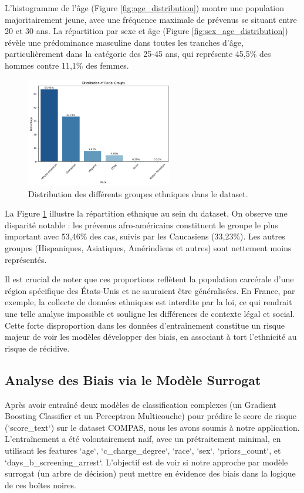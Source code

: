 \documentclass{article}
\begin{document}
\quad L'histogramme de l'âge (Figure \ref{fig:age_distribution}) montre une population majoritairement jeune, avec une fréquence maximale de prévenus se situant entre 20 et 30 ans. La répartition par sexe et âge (Figure \ref{fig:sex_age_distribution}) révèle une prédominance masculine dans toutes les tranches d'âge, particulièrement dans la catégorie des 25-45 ans, qui représente 45,5\% des hommes contre 11,1\% des femmes.

\begin{figure}[h!]
    \centering
    \includegraphics[width=0.57\textwidth]{plot_ethnie.png}
    \caption{Distribution des différents groupes ethniques dans le dataset.}
    \label{fig:race_distribution}
\end{figure}


\quad La Figure \ref{fig:race_distribution} illustre la répartition ethnique au sein du dataset. On observe une disparité notable : les prévenus afro-américains constituent le groupe le plus important avec 53,46\% des cas, suivis par les Caucasiens (33,23\%). Les autres groupes (Hispaniques, Asiatiques, Amérindiens et autres) sont nettement moins représentés.

\quad Il est crucial de noter que ces proportions reflètent la population carcérale d'une région spécifique des États-Unis et ne sauraient être généralisées. En France, par exemple, la collecte de données ethniques est interdite par la loi, ce qui rendrait une telle analyse impossible et souligne les différences de contexte légal et social. Cette forte disproportion dans les données d'entraînement constitue un risque majeur de voir les modèles développer des biais, en associant à tort l'ethnicité au risque de récidive.

\subsection{Analyse des Biais via le Modèle Surrogat}

\quad Après avoir entraîné deux modèles de classification complexes (un Gradient Boosting Classifier et un Perceptron Multicouche) pour prédire le score de risque (`score\_text`) sur le dataset COMPAS, nous les avons soumis à notre application. L'entraînement a été volontairement naïf, avec un prétraitement minimal, en utilisant les features `age`, `c\_charge\_degree`, `race`, `sex`, `priors\_count`, et `days\_b\_screening\_arrest`. L'objectif est de voir si notre approche par modèle surrogat (un arbre de décision) peut mettre en évidence des biais dans la logique de ces boîtes noires.
\end{document}
